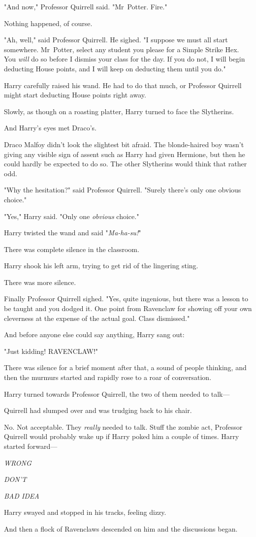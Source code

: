 "And now," Professor Quirrell said. "Mr~Potter. Fire."

Nothing happened, of course.

"Ah, well," said Professor Quirrell. He sighed. "I suppose we must all start
somewhere. Mr~Potter, select any student you please for a Simple Strike Hex.
You \emph{will} do so before I dismiss your class for the day. If you do not, I
will begin deducting House points, and I will keep on deducting them until you
do."

Harry carefully raised his wand. He had to do that much, or Professor Quirrell
might start deducting House points right away.

Slowly, as though on a roasting platter, Harry turned to face the Slytherins.

And Harry’s eyes met Draco’s.

Draco Malfoy didn’t look the slightest bit afraid. The blonde-haired boy wasn’t
giving any visible sign of assent such as Harry had given Hermione, but then he
could hardly be expected to do so. The other Slytherins would think that rather
odd.

"Why the hesitation?" said Professor Quirrell. "Surely there’s only one obvious
choice."

"Yes," Harry said. "Only one \emph{obvious} choice."

Harry twisted the wand and said "\emph{Ma-ha-su!}"

There was complete silence in the classroom.

Harry shook his left arm, trying to get rid of the lingering sting.

There was more silence.

Finally Professor Quirrell sighed. "Yes, quite ingenious, but there was a
lesson to be taught and you dodged it. One point from Ravenclaw for showing off
your own cleverness at the expense of the actual goal. Class dismissed."

And before anyone else could say anything, Harry sang out:

"Just kidding! RAVENCLAW!"

There was silence for a brief moment after that, a sound of people thinking,
and then the murmurs started and rapidly rose to a roar of conversation.

Harry turned towards Professor Quirrell, the two of them needed to talk—

Quirrell had slumped over and was trudging back to his chair.

No. Not acceptable. They \emph{really} needed to talk. Stuff the zombie act,
Professor Quirrell would probably wake up if Harry poked him a couple of times.
Harry started forward—

\emph{WRONG}

\emph{DON’T}

\emph{BAD IDEA}

Harry swayed and stopped in his tracks, feeling dizzy.

And then a flock of Ravenclaws descended on him and the discussions began.
